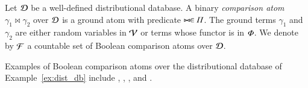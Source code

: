 \begin{definition}\label{def:comparison-atoms-set}
Let $\mathcal{D}$ be a well-defined distributional database. 
A binary \emph{comparison atom} $\gamma_1 {\bowtie} \gamma_2$ over $\mathcal{D}$ is a ground atom with predicate $\bowtie \in {\Pi}$. The ground terms $\gamma_1$  and $\gamma_2$ are either random variables in $\mathcal{V}$ or terms whose functor is in ${\Phi}$.
We denote by $\mathcal{F}$ a countable set of  
Boolean comparison atoms over $\mathcal{D}$.
\end{definition}

\begin{example}
    Examples of Boolean comparison atoms over the distributional database of Example~\ref{ex:dist_db} include   ,  , ,  and . 
\end{example}



